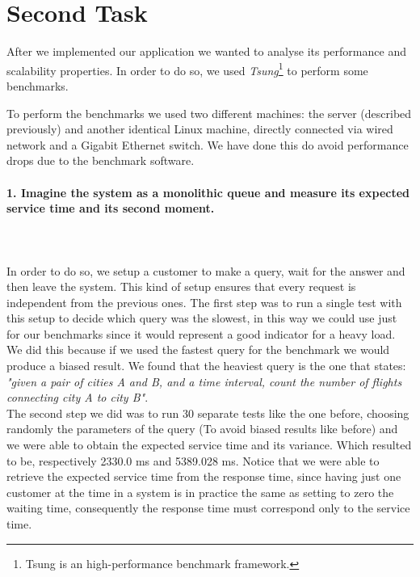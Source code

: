 \documentclass[11pt]{scrartcl} %
\begin{document}
\section{Second Task}

After we implemented our application we wanted to analyse its performance and scalability properties. In order to do so, we used \textit{Tsung}\footnote{Tsung is an high-performance benchmark framework.} to perform some benchmarks.

To perform the benchmarks we used two different machines: the server (described previously) and another identical Linux machine, directly connected via wired network and a Gigabit Ethernet switch. We have done this do avoid performance drops due to the benchmark software.




\paragraph*{1. Imagine the system as a monolithic queue and measure its expected service time and its second moment.} \mbox{}\\\\ 

In order to do so, we setup a customer to make a query, wait for the answer and then leave the system. 
This kind of setup ensures that every request is independent from the previous ones. 
The first step was to run a single test with this setup to decide which query was the slowest, in this way we could use just for our benchmarks since it would represent a good indicator for a heavy load. 
We did this because if we used the fastest query for the benchmark we would produce a biased result. We found that the heaviest query is the one that states: \textit{"given a pair of cities A and B, and a time interval, count the number of flights connecting city A to city B"}.\\


The second step we did was to run 30 separate tests like the one before, choosing randomly the parameters of the query (To avoid biased results like before) and we were able to obtain the expected service time and its variance. Which resulted to be, respectively 2330.0 ms and 5389.028 ms.
Notice that we were able to retrieve the expected service time from the response time, since having just one customer at the time in a system is in practice the same as setting to zero the waiting time, consequently the response time must correspond only to the service time. 
\end{document}
